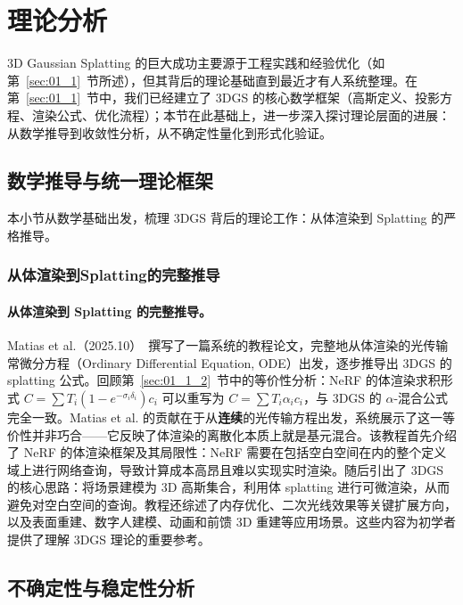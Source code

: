 \section{理论分析}
\label{sec:01_4}

3D Gaussian Splatting 的巨大成功主要源于工程实践和经验优化（如第~\ref{sec:01_1}~节所述），但其背后的理论基础直到最近才有人系统整理。在第~\ref{sec:01_1}~节中，我们已经建立了 3DGS 的核心数学框架（高斯定义、投影方程、渲染公式、优化流程）；本节在此基础上，进一步深入探讨理论层面的进展：从数学推导到收敛性分析，从不确定性量化到形式化验证。

\subsection{数学推导与统一理论框架}
\label{sec:01_4_1}

本小节从数学基础出发，梳理 3DGS 背后的理论工作：从体渲染到 Splatting 的严格推导。

\subsubsection{从体渲染到Splatting的完整推导}

\paragraph{从体渲染到 Splatting 的完整推导。} Matias et al.（2025.10）~\cite{2510_18101}撰写了一篇系统的教程论文，完整地从体渲染的光传输常微分方程（Ordinary Differential Equation, ODE）出发，逐步推导出 3DGS 的 splatting 公式。回顾第~\ref{sec:01_1_2}~节中的等价性分析：NeRF 的体渲染求积形式 $C = \sum T_i(1-e^{-\sigma_i \delta_i})c_i$ 可以重写为 $C = \sum T_i \alpha_i c_i$，与 3DGS 的 $\alpha$-混合公式完全一致。Matias et al. 的贡献在于从\textbf{连续}的光传输方程出发，系统展示了这一等价性并非巧合——它反映了体渲染的离散化本质上就是基元混合。该教程首先介绍了 NeRF 的体渲染框架及其局限性：NeRF 需要在包括空白空间在内的整个定义域上进行网络查询，导致计算成本高昂且难以实现实时渲染。随后引出了 3DGS 的核心思路：将场景建模为 3D 高斯集合，利用体 splatting 进行可微渲染，从而避免对空白空间的查询。教程还综述了内存优化、二次光线效果等关键扩展方向，以及表面重建、数字人建模、动画和前馈 3D 重建等应用场景。这些内容为初学者提供了理解 3DGS 理论的重要参考。

\subsection{不确定性与稳定性分析}
\label{sec:01_4_2}

